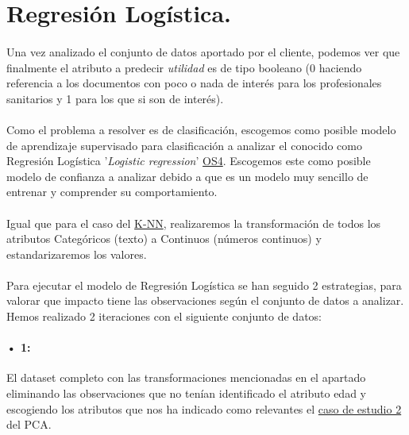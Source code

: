 \section{Regresión Logística.}
\label{section:lr}

\paragraph{}
Una vez analizado el conjunto de datos aportado por el cliente, podemos ver que finalmente el atributo a predecir \textit{utilidad} es de tipo booleano (0 haciendo referencia a los documentos con poco o nada de interés para los profesionales sanitarios y 1 para los que si son de interés).

\paragraph{}
Como el problema a resolver es de clasificación, escogemos como posible modelo de aprendizaje supervisado para clasificación a analizar el conocido como Regresión Logística '\textit{Logistic regression}'\cite{ref:lr_def} \hyperref[os:OS4]{OS4}. Escogemos este como posible modelo de confianza a analizar debido a que es un modelo muy sencillo de entrenar y comprender su comportamiento\cite{ref:lr_understanding}.

\paragraph{}
Igual que para el caso del \hyperref[section:knn]{K-NN}, realizaremos la transformación de todos los atributos Categóricos (texto) a Continuos (números continuos) y estandarizaremos los valores.

\paragraph{}
Para ejecutar el modelo de Regresión Logística se han seguido 2 estrategias, para valorar que impacto tiene las observaciones según el conjunto de datos a analizar. Hemos realizado 2 iteraciones con el siguiente conjunto de datos:

\label{section:lr_casos}
\paragraph{• 1: } El dataset completo con las transformaciones mencionadas en el apartado  eliminando las observaciones que no tenían identificado el atributo edad y escogiendo los atributos que nos ha indicado como relevantes el \hyperref[result:pca_case2]{caso de estudio 2} del PCA.

